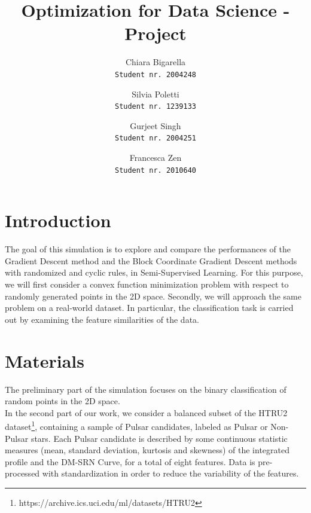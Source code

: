 \documentclass[10pt,twocolumn,letterpaper]{article}
\begin{document}
\title{Optimization for Data Science - Project}
\author{Chiara Bigarella\\{\tt\footnotesize Student nr. 2004248}\and Silvia Poletti\\{\tt\footnotesize Student nr. 1239133}\and Gurjeet Singh\\{\tt\footnotesize Student nr. 2004251}\and Francesca Zen\\{\tt\footnotesize Student nr. 2010640}}
\maketitle

\section{Introduction}
The goal of this simulation is to explore and compare the performances of the Gradient Descent method and the Block Coordinate Gradient Descent methods with randomized and cyclic rules, in Semi-Supervised Learning. For this purpose, we will first consider a convex function minimization problem with respect to randomly generated points in the 2D space. Secondly, we will approach the same problem on a real-world dataset. In particular, the classification task is carried out by examining the feature similarities of the data.

\section{Materials}
The preliminary part of the simulation focuses on the binary classification of random points in the 2D space.\\ 
In the second part of our work, we consider a balanced subset of the HTRU2 dataset\footnote{https://archive.ics.uci.edu/ml/datasets/HTRU2}, containing a sample of Pulsar candidates, labeled as Pulsar or Non-Pulsar stars. Each Pulsar candidate is described by some continuous statistic measures (mean, standard deviation, kurtosis and skewness) of the integrated profile and the DM-SRN Curve, for a total of eight features. Data is pre-processed with standardization in order to reduce the variability of the features.\\
\end{document}
